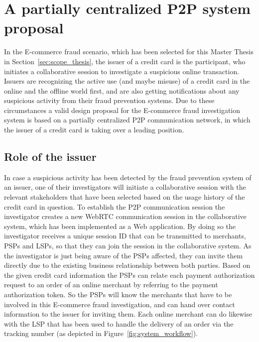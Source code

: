 
\section{A partially centralized \gls{P2P} system proposal}
\label{sec:p2p_partially_centralized_system}

In the \gls{E-commerce} fraud scenario, which has been selected for this Master Thesis in Section~\ref{sec:scope_thesis}, the issuer of a credit card is the participant, who initiates a collaborative session to investigate a suspicious online transaction. Issuers are recognizing the active use (and maybe misuse) of a credit card in the online and the offline world first, and are also getting notifications about any suspicious activity from their fraud prevention systems. Due to these circumstances a valid design proposal for the \gls{E-commerce} fraud investigation system is based on a partially centralized \gls{P2P} communication network, in which the issuer of a credit card is taking over a leading position.

\subsection{Role of the issuer}
\label{subsec:p2p_partially_issuer_collecting}

In case a suspicious activity has been detected by the fraud prevention system of an issuer, one of their investigators will initiate a collaborative session with the relevant stakeholders that have been selected based on the usage history of the credit card in question. To establish the \gls{P2P} communication session the investigator creates a new \gls{WebRTC} communication session in the collaborative system, which has been implemented as a Web application. By doing so the investigator receives a unique session ID that can be transmitted to merchants, \gls{PSP}s and \gls{LSP}s, so that they can join the session in the collaborative system. As the investigator is just being aware of the \gls{PSP}s affected, they can invite them directly due to the existing business relationship between both parties. Based on the given credit card information the \gls{PSP}s can relate each payment authorization request to an order of an online merchant by referring to the payment authorization token. So the \gls{PSP}s will know the merchants that have to be involved in this \gls{E-commerce} fraud investigation, and can hand over contact information to the issuer for inviting them. Each online merchant can do likewise with the \gls{LSP} that has been used to handle the delivery of an order via the tracking number (as depicted in Figure~\ref{fig:system_workflow}). \\

